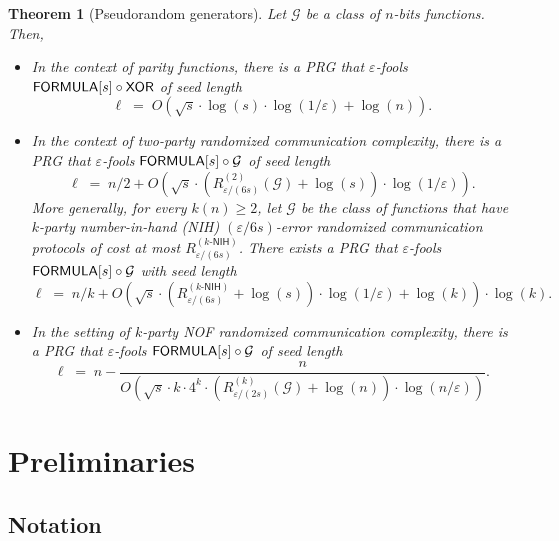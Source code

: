 \documentclass[10pt,a4paper]{article}
\newtheorem{theorem}{Theorem}
\newcommand{\FORMULA}{{\sf FORMULA}}
\begin{document}
	\begin{theorem}[Pseudorandom generators] \label{thm:main_PRG}
    	Let $\mathcal{G}$ be a class of $n$-bits functions. Then,
    	\begin{itemize}
            \item[\emph{1.}] In the context of parity functions, there is a \emph{PRG} that $\varepsilon$-fools $\FORMULA[s] \circ \mathsf{XOR}$ of seed length
            $$
                \ell \; = \; O \! \left (\sqrt{s}\cdot\log(s)\cdot\log(1/\varepsilon) + \log(n)\right).
            $$
            
            \item[\emph{2.}] In the context of two-party randomized communication complexity, there is a \emph{PRG} that $\varepsilon$-fools $\FORMULA[s] \circ \mathcal{G}$ of seed length
            $$
                \ell \; = \;  n/2+O \! \left(\sqrt{s}\cdot\left(R^{(2)}_{\varepsilon/(6s)}(\mathcal{G})+\log(s)\right)\cdot\log(1/\varepsilon)\right).
            $$
            More generally, for every $k(n) \geq 2$, let $\mathcal{G}$ be the class of functions that have $k$-party number-in-hand \emph{(NIH)} $(\varepsilon/6s)$-error randomized communication protocols of cost at most $R^{(k\text{-}\mathsf{NIH})}_{\varepsilon/(6s)}$. There exists a \emph{PRG} that $\varepsilon$-fools $\FORMULA[s]\circ \mathcal{G}$ with seed length
            $$
               \ell \; = \; n/k+O \! \left(\sqrt{s}\cdot \left (R^{(k\text{-}\mathsf{NIH})}_{\varepsilon/(6s)} +\log (s) \right )\cdot \log(1/\varepsilon) +\log(k)\right)\cdot\log(k).
            $$
            
            \item[\emph{3.}] In the setting of $k$-party \emph{NOF} randomized communication complexity, there is a \emph{PRG} that $\varepsilon$-fools $\FORMULA[s] \circ \mathcal{G}$ of seed length
            $$
                \ell \; = \; n-\frac{n}{O \! \left(\sqrt{s}\cdot k \cdot 4^k \cdot \left(  R^{(k)}_{\varepsilon/(2s)}(\mathcal{G})+\log(n)\right)\cdot\log(n/\varepsilon)\right)}.
            $$
    	\end{itemize}
	\end{theorem}

\setcounter{section}{1}
\setcounter{theorem}{7}
	\section{Preliminaries}\label{sec:preliminaries}
	
	\subsection{Notation}
	
\end{document}
